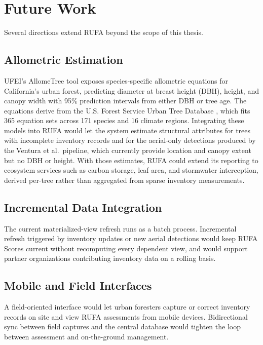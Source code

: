 \section{Future Work}

Several directions extend RUFA beyond the scope of this thesis.

\subsection{Allometric Estimation}

UFEI's AllomeTree tool \cite{ufeiAllometree} exposes species-specific allometric equations for California's urban forest, predicting diameter at breast height (DBH), height, and canopy width with 95\% prediction intervals from either DBH or tree age. The equations derive from the U.S. Forest Service Urban Tree Database \cite{mcpherson2016utd}, which fits 365 equation sets across 171 species and 16 climate regions. Integrating these models into RUFA would let the system estimate structural attributes for trees with incomplete inventory records and for the aerial-only detections produced by the Ventura et al.\ pipeline, which currently provide location and canopy extent but no DBH or height. With those estimates, RUFA could extend its reporting to ecosystem services such as carbon storage, leaf area, and stormwater interception, derived per-tree rather than aggregated from sparse inventory measurements.

\subsection{Incremental Data Integration}

The current materialized-view refresh runs as a batch process. Incremental refresh triggered by inventory updates or new aerial detections would keep RUFA Scores current without recomputing every dependent view, and would support partner organizations contributing inventory data on a rolling basis.

\subsection{Mobile and Field Interfaces}

A field-oriented interface would let urban foresters capture or correct inventory records on site and view RUFA assessments from mobile devices. Bidirectional sync between field captures and the central database would tighten the loop between assessment and on-the-ground management.


